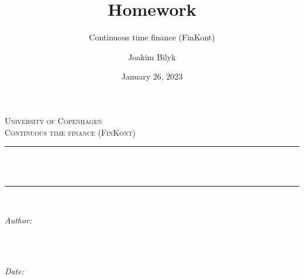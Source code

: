 \documentclass[
]{article}
\title{Homework}
\subtitle{Continuous time finance (FinKont)}
\author{Joakim Bilyk}
\date{January 26, 2023}
\begin{document}

{
\begin{titlepage}
\newcommand{\HRule}{\rule{\linewidth}{0.5mm}} %

\center %
 

\textsc{\LARGE University of Copenhagen}\\[4cm] %
\textsc{\Large Continuous time finance
(FinKont)}\\[0.5cm] %


\HRule \\[0.4cm]
{ \huge \bfseries \thetitle}\\[0.4cm] %
\HRule \\[1.5cm]
 

\begin{minipage}{0.4\textwidth}
\begin{flushleft} \large
\emph{Author:}\\
\textsc{\theauthor} \\
\end{flushleft}
\end{minipage}
~
\begin{minipage}{0.4\textwidth}
\begin{flushright} \large
\emph{Date:} \\
\textsc{\thedate} \\
\end{flushright}
\end{minipage}\\[2cm]


\end{titlepage}}
\end{document}

